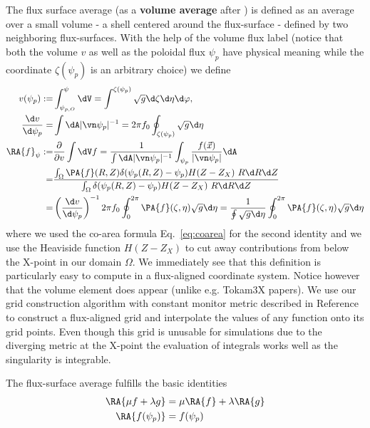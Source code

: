 The flux surface average (as a {\bf volume average} after \cite{haeseleer}) is defined as an average over a
small volume - a shell centered around the flux-surface - defined by two neighboring flux-surfaces.
With the help of the volume
flux label (notice that both the volume $v$ as well as the poloidal flux $\psi_p$ have physical
meaning while the coordinate $\zeta(\psi_p)$ is an arbitrary choice) we define
\begin{align} \label{eq:fsa_vol}
v(\psi_p) :=& \int_{\psi_{p,O}}^\psi \dV = \int^{\zeta(\psi_p)} \sqrt{g}\d\zeta\d\eta\d\varphi,
\\
\frac{\d v}{\d\psi_p} =& \int\dA |\vn\psi_p|^{-1} = 2\pi f_0\oint_{\zeta(\psi_p)} \sqrt{g}\d\eta \\
\RA{ f }_\psi :=& \frac{\partial}{\partial v} \int \dV f
 = \frac{1}{\int \dA |\vn\psi_p|^{-1} } \int_{\psi_p} \frac{f(\vec x)}{|\vn\psi_p|} \dA \nonumber\\
=& \frac{\int_\Omega \PA{ f}(R,Z) \delta(\psi_p(R,Z)-\psi_{p})H(Z-Z_X)\ R \d R \d Z}
{\int_\Omega \delta(\psi_p(R,Z)-\psi_{p})H(Z-Z_X)\ R \d R \d Z}\nonumber\\
 =& \left(\frac{\d v}{\d\psi_p }\right)^{-1} 2\pi f_0 \oint_0^{2\pi} \PA{ f}(\zeta,\eta) \sqrt{g}\d\eta
 = \frac{1}{\oint \sqrt{g}\d\eta } \oint_0^{2\pi} \PA{ f}(\zeta,\eta) \sqrt{g}\d\eta
\end{align}
where we used the co-area formula Eq.~\eqref{eq:coarea} for the second identity
and we use the Heaviside function $H(Z-Z_X)$ to cut away contributions from below the X-point
in our domain $\Omega$.
 We immediately see that this definition is particularly easy to compute
 in a flux-aligned coordinate system. Notice however that the volume element
 does appear (unlike e.g. Tokam3X papers).
 We use our grid construction algorithm with constant monitor metric described in Reference~\cite{Wiesenberger2018} to construct a flux-aligned grid and interpolate
 the values of any function onto its grid points.
 Even though this grid is unusable for simulations due to the diverging metric at the X-point the
 evaluation of integrals works well as the singularity is integrable.

The flux-surface average fulfills the basic identities
\begin{align}
\label{eq:fsa_identities}
\RA{ \mu f + \lambda g} &= \mu\RA{ f} + \lambda \RA{ g} \\
\RA{ f(\psi_p)} &= f(\psi_p)
\end{align}

